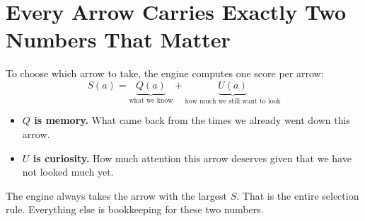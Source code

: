 \chapter{Every Arrow Carries Exactly Two Numbers That Matter}
\label{ch:arrow_scores}

To choose which arrow to take, the engine computes one score per arrow:
\begin{equation}
  S(a) = \underbrace{Q(a)}_{\text{what we know}} + \underbrace{U(a)}_{\text{how much we still want to look}}
\end{equation}

\begin{itemize}[leftmargin=2em]
  \item \textbf{$Q$ is memory.} What came back from the times we already went down this arrow.
  \item \textbf{$U$ is curiosity.} How much attention this arrow deserves given that we have not looked much yet.
\end{itemize}

\begin{established}
The engine always takes the arrow with the largest $S$. That is the entire selection rule. Everything else is bookkeeping for these two numbers.
\end{established}

